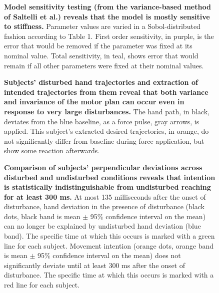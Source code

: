 \begin{figure}
\caption{
{\bf Model sensitivity testing (from the variance-based method of Saltelli et al.\cite{saltelli2010variance}) reveals that the model is mostly sensitive to stiffness.} Parameter values are varied in a Sobol-distributed fashion according to Table 1. First order sensitivity, in purple, is the error that would be removed if the parameter was fixed at its nominal value. Total sensitivity, in teal, shows error that would remain if all other parameters were fixed at their nominal values.
}
\label{fig:sensitivity}
\end{figure}

\begin{figure}
\caption{
{\bf Subjects' disturbed hand trajectories and extraction of intended trajectories from them reveal that both variance and invariance of the motor plan can occur even in response to very large disturbances.} The hand path, in black, deviates from the blue baseline, as a force pulse, gray arrows, is applied. This subject's extracted desired trajectories, in orange, do not significantly differ from baseline during force application, but show some reaction afterwards.
}
\label{fig:anecdotes}
\end{figure}

\begin{figure}
\caption{
{\bf Comparison of subjects' perpendicular deviations across disturbed and undisturbed conditions reveals that intention is statistically indistinguishable from undisturbed reaching for at least 300 ms.} At most 135 milliseconds after the onset of disturbance, hand deviation in the presence of disturbance (black dots, black band is mean $\pm$ 95\% confidence interval on the mean) can no longer be explained by undisturbed hand deviation (blue band). The specific time at which this occurs is marked with a green line for each subject. Movement intention (orange dots, orange band is mean $\pm$ 95\% confidence interval on the mean) does not significantly deviate until at least 300 ms after the onset of disturbance. The specific time at which this occurs is marked with a red line for each subject.
}
\label{fig:grouptrends}
\end{figure}
\pagebreak

